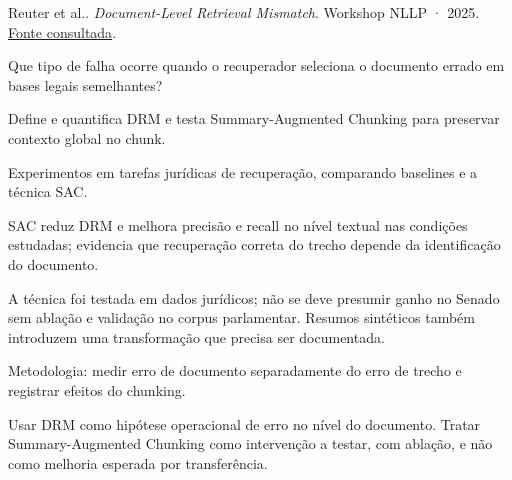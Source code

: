 {\small Reuter et al.. \textit{Document-Level Retrieval Mismatch}. Workshop NLLP · 2025. \href{https://aclanthology.org/2025.nllp-1.3/}{Fonte consultada}.\par}

Que tipo de falha ocorre quando o recuperador seleciona o documento errado em bases legais semelhantes?

Define e quantifica DRM e testa Summary-Augmented Chunking para preservar contexto global no chunk.

Experimentos em tarefas jurídicas de recuperação, comparando baselines e a técnica SAC.

SAC reduz DRM e melhora precisão e recall no nível textual nas condições estudadas; evidencia que recuperação correta do trecho depende da identificação do documento.

\begin{itemize}
\end{itemize}

A técnica foi testada em dados jurídicos; não se deve presumir ganho no Senado sem ablação e validação no corpus parlamentar. Resumos sintéticos também introduzem uma transformação que precisa ser documentada.

Metodologia: medir erro de documento separadamente do erro de trecho e registrar efeitos do chunking.

Usar DRM como hipótese operacional de erro no nível do documento. Tratar Summary-Augmented Chunking como intervenção a testar, com ablação, e não como melhoria esperada por transferência.

